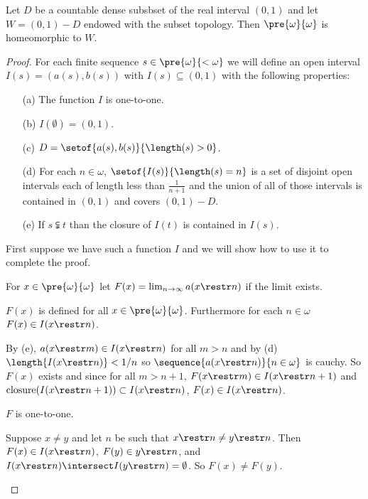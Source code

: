 \documentclass[oneside,12pt]{amsart}
\begin{document}
\begin{theorem}
Let $D$ be a countable dense subsbset of the real interval $(0,1)$ and let $W=(0,1) - D$
endowed with the subset topology.
Then $\pre{\omega}{\omega}$ is homeomorphic to $W$.
\end{theorem}
\begin{proof}
For each finite sequence $s\in \pre{\omega}{<\omega}$ we will define an open interval
$I(s) =  \left(a(s), b(s) \right)$ with $I(s)\subseteq (0,1)$ with the following properties:
\begin{itemize}
\item[(a)] The function $I$ is one-to-one.
\item[(b)] $I(\emptyset) = (0,1)$.
\item[(c)] $D = \setof{a(s), b(s)}{\length(s) > 0}$.
\item[(d)] For each $n\in\omega$, $\setof{I(s)}{\length(s) = n}$ is a set of disjoint open intervals
each of length less than $\frac{1}{n+1}$ and the union of all of those intervals is contained in $(0,1)$ and covers $(0,1) - D$.
\item[(e)] If $s \subsetneqq t$ than the closure of $I(t)$ is contained in $I(s)$.
\end{itemize}

First suppose we have such a function $I$ and we will show how to use it to complete the proof.

For $x\in \pre{\omega}{\omega}$ let $F(x) = \lim_{n\to\infty} a(x\restr n)$ if the limit exists.

\begin{claim}
$F(x)$ is defined for all $x\in \pre{\omega}{\omega}$. Furthermore for each $n\in\omega$
$F(x) \in I(x\restr n)$.
\end{claim}
\begin{subproof}
By (e), $a(x\restr m) \in I(x\restr n)$ for all $m>n$ and by (d) $\length{I(x\restr n)} < 1/n$ so
$\sequence{a(x\restr n)}{n\in\omega}$ is cauchy. So $F(x)$ exists and since for all
$m>n+1$, $F(x\restr m) \in I(x\restr n+1)$ and
$\text{closure}(I(x\restr n+1)) \subset I(x\restr n)$, $F(x)\in I(x\restr n)$.
\end{subproof}

\begin{claim}
$F$ is one-to-one.
\end{claim}
\begin{subproof}
Suppose $x\not= y$ and let $n$ be such that $x\restr n \not= y\restr n$. Then
$F(x)\in I(x\restr n)$, $F(y) \in y\restr n$, and $I(x\restr n) \intersect I(y\restr n) = \emptyset$.
So $F(x)\not= F(y)$.
\end{subproof}


\end{proof}
\end{document}
